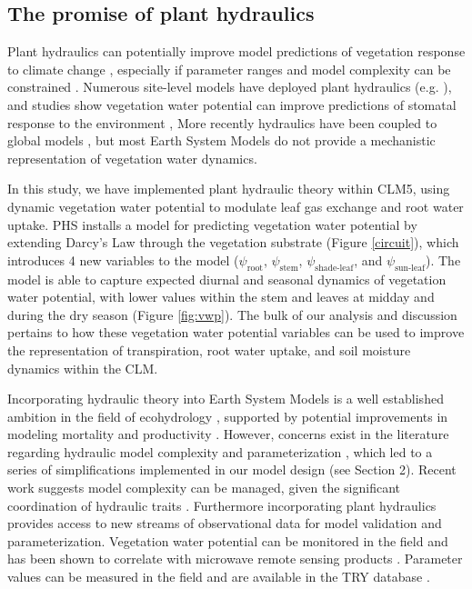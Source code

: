 \documentclass[draft,linenumbers]{agujournal}
\begin{document}
\subsection{The promise of plant hydraulics}
    Plant hydraulics can potentially improve model predictions of vegetation response to climate change \citep{sperry2015}, 
    especially if parameter ranges and model complexity can be constrained \citep{rogers2017}.
    Numerous site-level models have deployed plant hydraulics (e.g. \citet{williams1996,sperry1998,bohrer2005}), and studies show
    vegetation water potential can improve predictions of stomatal response to the environment \citep{sperry2017,anderegg2017},
    More recently hydraulics have been coupled to global models \citep{bonan2014,xu2016,christoffersen2016}, 
    but most Earth System Models do not provide a mechanistic representation of vegetation water dynamics.

    In this study, we have implemented plant hydraulic theory within CLM5, 
    using dynamic vegetation water potential to modulate leaf gas exchange and root water uptake.
    PHS installs a model for predicting vegetation water potential by extending Darcy's Law through the vegetation substrate (Figure \ref{circuit}), 
    which introduces 4 new variables to the model ($\psi_{\text{root}}$, $\psi_{\text{stem}}$, $\psi_{\text{shade-leaf}}$, and $\psi_{\text{sun-leaf}}$).  
    The model is able to capture expected diurnal and seasonal dynamics of vegetation water potential, 
    with lower values within the stem and leaves at midday and during the dry season (Figure \ref{fig:vwp}).
    The bulk of our analysis and discussion pertains to how these vegetation water potential variables can be used to improve the representation of transpiration, root water uptake, and soil moisture dynamics within the CLM. 

    Incorporating hydraulic theory into Earth System Models is a well established ambition in the field of ecohydrology \citep{sperry2015},  supported by potential improvements in modeling mortality and productivity \citep{choat2012,mcdowell2018}.
    However, concerns exist in the literature regarding hydraulic model complexity and parameterization \citep{verhoef2014,drake2017}, 
    which led to a series of simplifications implemented in our model design (see Section 2).
    Recent work suggests model complexity can be managed, given the significant coordination of hydraulic traits \citep{bartlett2016,christoffersen2016}.
    Furthermore incorporating plant hydraulics provides access to new streams of observational data for model validation and parameterization.
    Vegetation water potential can be monitored in the field \citep{boyer1967} and has been shown to correlate with microwave remote sensing products \citep{momen2017}.
    Parameter values can be measured in the field \citep{sack2002} and are available in the TRY database \citep{kattge2011}.
\end{document}
